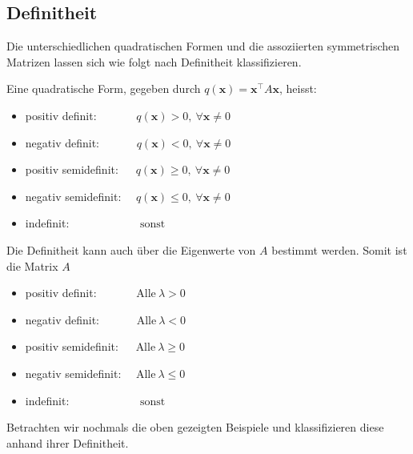 \subsection{Definitheit}

Die unterschiedlichen quadratischen Formen und die assoziierten symmetrischen Matrizen lassen sich wie folgt nach Definitheit klassifizieren.

\begin{tcolorbox}[colback=gray!30, colframe=gray!80, title=Definitheit quadratischer Formen]
    Eine quadratische Form, gegeben durch \( q(\mathbf{x}) = \mathbf{x}^\top A \mathbf{x} \), heisst:
    \begin{itemize}
        \item positiv definit: \( \qquad \quad \ q(\mathbf{x}) > 0, \ \forall \mathbf{x} \neq 0 \)
        \item negativ definit: \( \qquad \quad q(\mathbf{x}) < 0, \ \forall \mathbf{x} \neq 0 \)
        \item positiv semidefinit: \( \quad \ q(\mathbf{x}) \geq 0, \ \forall \mathbf{x} \neq 0 \)
        \item negativ semidefinit: \( \quad q(\mathbf{x}) \leq 0, \ \forall \mathbf{x} \neq 0 \)
        \item indefinit: \( \qquad \qquad \qquad \text{sonst} \)
    \end{itemize}

    Die Definitheit kann auch über die Eigenwerte von \( A \) bestimmt werden. Somit ist die Matrix \( A \)
    \begin{itemize}
        \item positiv definit: \( \qquad \quad \ \text{Alle} \ \lambda > 0 \)
        \item negativ definit: \( \qquad \quad \text{Alle} \ \lambda < 0 \)
        \item positiv semidefinit: \( \quad \ \text{Alle} \ \lambda \geq 0 \)
        \item negativ semidefinit: \( \quad \text{Alle} \ \lambda \leq 0 \)
        \item indefinit: \( \qquad \qquad \qquad \text{sonst} \)
    \end{itemize}
\end{tcolorbox}

\vspace{1\baselineskip}

Betrachten wir nochmals die oben gezeigten Beispiele und klassifizieren diese anhand ihrer Definitheit.

